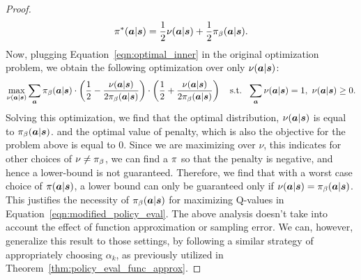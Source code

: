 \begin{proof}
\begin{equation}
    \pi^*(\boldsymbol{a}|\boldsymbol{s}) = \frac{1}{2} \nu(\boldsymbol{a}|\boldsymbol{s}) + \frac{1}{2} {\pi_\beta}(\boldsymbol{a}|\boldsymbol{s}).
    \label{eqn:optimal_inner}
\end{equation}
Now, plugging Equation~\ref{eqn:optimal_inner} in the original optimization problem, we obtain the following optimization over only $\nu(\boldsymbol{a}|\boldsymbol{s})$:
\begin{equation}
    \max_{\nu(\boldsymbol{a}|\boldsymbol{s})} \sum_{\boldsymbol{a}} {\pi_\beta}(\boldsymbol{a}|\boldsymbol{s}) \cdot \left( \frac{1}{2} - \frac{\nu(\boldsymbol{a}|\boldsymbol{s})}{2 {\pi_\beta}(\boldsymbol{a}|\boldsymbol{s})} \right) \cdot \left( \frac{1}{2} + \frac{\nu(\boldsymbol{a}|\boldsymbol{s})}{2 {\pi_\beta}(\boldsymbol{a}|\boldsymbol{s})} \right)~~~ \text{s.t.}~~ \sum_{\boldsymbol{a}} \nu(\boldsymbol{a}|\boldsymbol{s}) = 1,~ \nu(\boldsymbol{a}|\boldsymbol{s}) \geq 0.
\end{equation}
Solving this optimization, we find that the optimal distribution, $\nu(\boldsymbol{a}|\boldsymbol{s})$ is equal to ${\pi_\beta}(\boldsymbol{a}|\boldsymbol{s})$. and the optimal value of penalty, which is also the objective for the problem above is equal to $0$. Since we are maximizing over $\nu$, this indicates for other choices of $\nu \neq {\pi_\beta}$, we can find a $\pi$ so that the penalty is negative, and hence a lower-bound is not guaranteed. Therefore, we find that with a worst case choice of $\pi(\boldsymbol{a}|\boldsymbol{s})$, a lower bound can only be guaranteed only if $\nu(\boldsymbol{a}|\boldsymbol{s}) = {\pi_\beta}(\boldsymbol{a}|\boldsymbol{s})$. This justifies the necessity of ${\pi_\beta}(\boldsymbol{a}|\boldsymbol{s})$ for maximizing Q-values in Equation~\ref{eqn:modified_policy_eval}. The above analysis doesn't take into account the effect of function approximation or sampling error. We can, however, generalize this result to those settings, by following a similar strategy of appropriately choosing $\alpha_k$, as previously utilized in Theorem~\ref{thm:policy_eval_func_approx}.
\end{proof}




